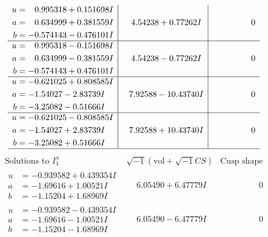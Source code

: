 \documentclass[1p]{elsarticle_modified}
\theoremstyle{definition}
\newcommand{\I}{\sqrt{-1}}
\begin{document}
$$\begin{array}{c|c|c}
\begin{aligned}
u &= \phantom{-}0.995318 + 0.151698 I \\
a &= \phantom{-}0.634999 + 0.381559 I \\
b &= -0.574143 - 0.476101 I\end{aligned}
 & \phantom{-}4.54238 + 0.77262 I & \phantom{-0.000000 } 0 \\ \hline\begin{aligned}
u &= \phantom{-}0.995318 - 0.151698 I \\
a &= \phantom{-}0.634999 - 0.381559 I \\
b &= -0.574143 + 0.476101 I\end{aligned}
 & \phantom{-}4.54238 - 0.77262 I & \phantom{-0.000000 } 0 \\ \hline\begin{aligned}
u &= -0.621025 + 0.808585 I \\
a &= -1.54027 - 2.83739 I \\
b &= -3.25082 - 0.51666 I\end{aligned}
 & \phantom{-}7.92588 - 10.43740 I & \phantom{-0.000000 } 0 \\ \hline\begin{aligned}
u &= -0.621025 - 0.808585 I \\
a &= -1.54027 + 2.83739 I \\
b &= -3.25082 + 0.51666 I\end{aligned}
 & \phantom{-}7.92588 + 10.43740 I & \phantom{-0.000000 } 0\\
 \hline 
 \end{array}$$\newpage$$\begin{array}{c|c|c}  
\text{Solutions to }I^u_{1}& \I (\text{vol} + \sqrt{-1}CS) & \text{Cusp shape}\\
 \hline 
\begin{aligned}
u &= -0.939582 + 0.439354 I \\
a &= -1.69616 + 1.00521 I \\
b &= -1.15204 + 1.68969 I\end{aligned}
 & \phantom{-}6.05490 + 6.47779 I & \phantom{-0.000000 } 0 \\ \hline\begin{aligned}
u &= -0.939582 - 0.439354 I \\
a &= -1.69616 - 1.00521 I \\
b &= -1.15204 - 1.68969 I\end{aligned}
 & \phantom{-}6.05490 - 6.47779 I & \phantom{-0.000000 } 0 \\ \hline\begin{aligned}

\end{aligned}
\end{array}$$
\end{document}
